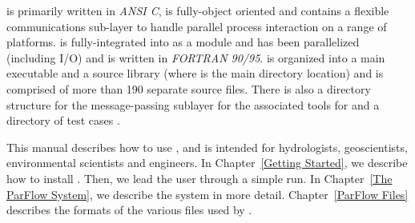 \parflow{} is primarily written in \emph{ANSI C}, is fully-object oriented and contains a flexible communications sub-layer to handle parallel process interaction on a range of platforms.   is fully-integrated into \parflow{} as a module and has been parallelized (including I/O) and is written in \emph{FORTRAN 90/95}.  \parflow{} is organized into a main executable  and a source library  (where  is the main directory location) and is comprised of more than 190 separate source files.  There is also a directory structure for the message-passing sublayer  for the associated tools  for   and a directory of test cases .

This manual describes how to use \parflow{}, and is intended for
hydrologists, geoscientists, environmental scientists and engineers.  In
Chapter~\ref{Getting Started}, we describe how to install \parflow{}.
Then, we lead the user through a simple \parflow{} run.  In
Chapter~\ref{The ParFlow System}, we describe the \parflow{} system in
more detail.  Chapter~\ref{ParFlow Files} describes the formats of the
various files used by \parflow{}.

